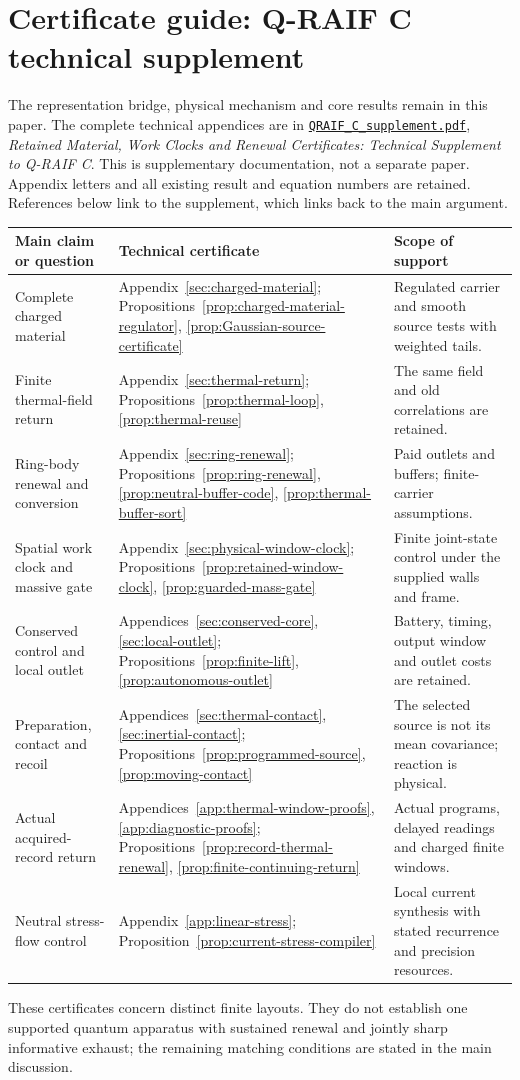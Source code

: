 \clearpage
\section*{Certificate guide: Q-RAIF C technical supplement}
\noindent The representation bridge, physical mechanism and core results
remain in this paper. The complete technical appendices are in
\href{QRAIF_C_supplement.pdf}{\texttt{QRAIF\_C\_supplement.pdf}},
\emph{Retained Material, Work Clocks and Renewal Certificates:
Technical Supplement to Q-RAIF C}. This is supplementary documentation,
not a separate paper. Appendix letters and all existing result and
equation numbers are retained. References below link to the supplement,
which links back to the main argument.

\medskip
{\small
\noindent\begin{tabular}{@{}P{.24\linewidth}P{.32\linewidth}P{.36\linewidth}@{}}
\toprule
Main claim or question & Technical certificate & Scope of support\\
\midrule
Complete charged material &
Appendix~\ref{sec:charged-material};
Propositions~\ref{prop:charged-material-regulator},
\ref{prop:Gaussian-source-certificate} &
Regulated carrier and smooth source tests with weighted tails.\\[3pt]
Finite thermal-field return &
Appendix~\ref{sec:thermal-return};
Propositions~\ref{prop:thermal-loop}, \ref{prop:thermal-reuse} &
The same field and old correlations are retained.\\[3pt]
Ring-body renewal and conversion &
Appendix~\ref{sec:ring-renewal};
Propositions~\ref{prop:ring-renewal},
\ref{prop:neutral-buffer-code}, \ref{prop:thermal-buffer-sort} &
Paid outlets and buffers; finite-carrier assumptions.\\[3pt]
Spatial work clock and massive gate &
Appendix~\ref{sec:physical-window-clock};
Propositions~\ref{prop:retained-window-clock},
\ref{prop:guarded-mass-gate} &
Finite joint-state control under the supplied walls and frame.\\[3pt]
Conserved control and local outlet &
Appendices~\ref{sec:conserved-core}, \ref{sec:local-outlet};
Propositions~\ref{prop:finite-lift}, \ref{prop:autonomous-outlet} &
Battery, timing, output window and outlet costs are retained.\\[3pt]
Preparation, contact and recoil &
Appendices~\ref{sec:thermal-contact}, \ref{sec:inertial-contact};
Propositions~\ref{prop:programmed-source}, \ref{prop:moving-contact} &
The selected source is not its mean covariance; reaction is physical.\\[3pt]
Actual acquired-record return &
Appendices~\ref{app:thermal-window-proofs}, \ref{app:diagnostic-proofs};
Propositions~\ref{prop:record-thermal-renewal},
\ref{prop:finite-continuing-return} &
Actual programs, delayed readings and charged finite windows.\\[3pt]
Neutral stress-flow control &
Appendix~\ref{app:linear-stress};
Proposition~\ref{prop:current-stress-compiler} &
Local current synthesis with stated recurrence and precision resources.\\
\bottomrule
\end{tabular}
}

\medskip\noindent\small
These certificates concern distinct finite layouts. They do not establish
one supported quantum apparatus with sustained renewal and jointly sharp
informative exhaust; the remaining matching conditions are stated in the
main discussion.
\clearpage
